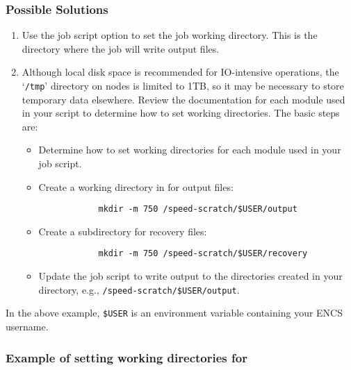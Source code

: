 \subsubsection{Possible Solutions}

\begin{enumerate}
	\item Use the  job script option to set the job working directory.
	This is the directory where the job will write output files.

 	\item Although local disk space is recommended for IO-intensive operations, the 
 	`\texttt{/tmp}' directory on  nodes is limited to 1TB, so it may be necessary 
	to store temporary data elsewhere. Review the documentation for each module
	used in your script to determine how to set working directories.
	The basic steps are:
	\begin{itemize}
		\item
		Determine how to set working directories for each module used in your job script.
		\item
		Create a working directory in  for output files:
		\begin{verbatim}
			mkdir -m 750 /speed-scratch/$USER/output
		\end{verbatim}
		\item
		Create a subdirectory for recovery files:
		\begin{verbatim}
			mkdir -m 750 /speed-scratch/$USER/recovery
		\end{verbatim}
		\item
		Update the job script to write output to the directories created in your 
		 directory, e.g., \verb!/speed-scratch/$USER/output!.
	\end{itemize}
\end{enumerate}
\noindent In the above example, \verb!$USER! is an environment variable containing your ENCS username.

\subsubsection{Example of setting working directories for }

